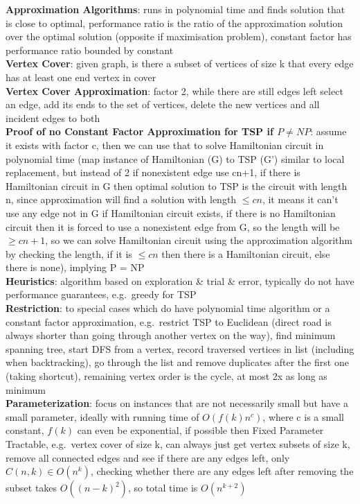 \documentclass[a4paper]{article}
\begin{document}
\begin{multicols}{2}
        \textbf{Approximation Algorithms}: runs in polynomial time and finds solution that is close to optimal, performance ratio is the ratio of the approximation solution over the optimal solution (opposite if maximisation problem), constant factor has performance ratio bounded by constant\\
        \textbf{Vertex Cover}: given graph, is there a subset of vertices of size k that every edge has at least one end vertex in cover\\
        \textbf{Vertex Cover Approximation}: factor 2, while there are still edges left select an edge, add its ends to the set of vertices, delete the new vertices and all incident edges to both\\
        \textbf{Proof of no Constant Factor Approximation for TSP if $P \neq NP$}: assume it exists with factor c, then we can use that to solve Hamiltonian circuit in polynomial time (map instance of Hamiltonian (G) to TSP (G') similar to local replacement, but instead of 2 if nonexistent edge use cn+1, if there is Hamiltonian circuit in G then optimal solution to TSP is the circuit with length n, since approximation will find a solution with length $\leq cn$, it means it can't use any edge not in G if Hamiltonian circuit exists, if there is no Hamiltonian circuit then it is forced to use a nonexistent edge from G, so the length will be $\geq cn+1$, so we can solve Hamiltonian circuit using the approximation algorithm by checking the length, if it is $\leq cn$ then there is a Hamiltonian circuit, else there is none), implying P = NP\\
        \textbf{Heuristics}: algorithm based on exploration \& trial \& error, typically do not have performance guarantees, e.g.\ greedy for TSP\\
        \textbf{Restriction}: to special cases which do have polynomial time algorithm or a constant factor approximation, e.g.\ restrict TSP to Euclidean (direct road is always shorter than going through another vertex on the way), find minimum spanning tree, start DFS from a vertex, record traversed vertices in list (including when backtracking), go through the list and remove duplicates after the first one (taking shortcut), remaining vertex order is the cycle, at most 2x as long as minimum\\
        \textbf{Parameterization}: focus on instances that are not necessarily small but have a small parameter, ideally with running time of $O(f(k)n^c)$, where c is a small constant, $f(k)$ can even be exponential, if possible then Fixed Parameter Tractable, e.g.\ vertex cover of size k, can always just get vertex subsets of size k, remove all connected edges and see if there are any edges left, only $C(n, k) \in O(n^k)$, checking whether there are any edges left after removing the subset takes $O({(n-k)}^2)$, so total time is $O(n^{k+2})$\\

\end{multicols}
\end{document}
